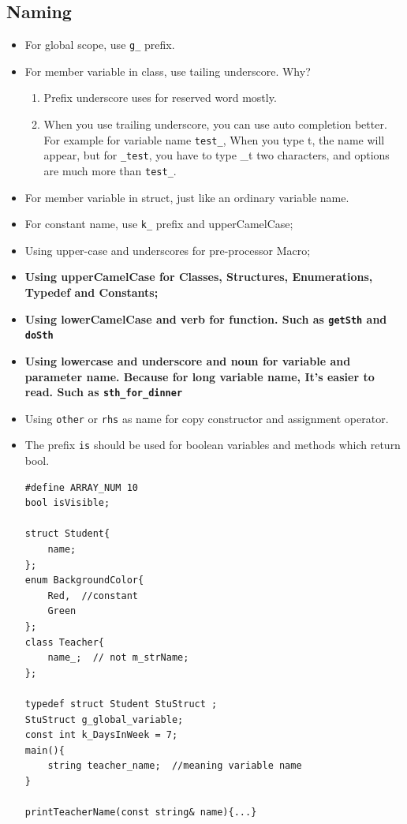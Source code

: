 \documentclass[a4paper,11pt,twoside]{book}
\begin{document}
\subsection{Naming}
\begin{itemize}
	
	\item For global scope, use \texttt{g\_} prefix.
	
	\item For member variable in class, use tailing underscore. Why? 
	\begin{enumerate}
		\item Prefix underscore uses for reserved word mostly.
		\item When you use trailing underscore, you can use auto completion better. For example for variable name \texttt{test\_}, When you type t, the name will appear, but for \texttt{\_test}, you have to type \_t two characters, and options are much more than \texttt{test\_}.
	\end{enumerate}
	
	\item For member variable in struct, just like an ordinary variable name. 
	
	\item For constant name, use \texttt{k\_} prefix and upperCamelCase;
	
	\item Using upper-case and underscores for pre-processor Macro;
	
	\item \textbf{Using upperCamelCase for Classes, Structures, Enumerations, Typedef and  Constants;}
	
	\item \textbf{Using lowerCamelCase and verb for function. Such as \texttt{getSth} and \texttt{doSth}}
	
	\item \textbf{Using lowercase and underscore  and noun for variable and parameter name. Because for long variable name, It's easier to read. Such as \texttt{sth\_for\_dinner}}
	
	\item Using \texttt{other} or \texttt{rhs} as name for copy constructor and assignment operator.
	
	\item The prefix \texttt{is} should be used for boolean variables and methods which return bool.
	
\begin{lstlisting}[numbers=none]
#define ARRAY_NUM 10
bool isVisible;

struct Student{
	name;
};
enum BackgroundColor{
	Red,  //constant
	Green
};
class Teacher{
	name_;  // not m_strName;  
};

typedef struct Student StuStruct ;
StuStruct g_global_variable;
const int k_DaysInWeek = 7;
main(){
	string teacher_name;  //meaning variable name
}

printTeacherName(const string& name){...}
\end{lstlisting}
\end{itemize}
\end{document}
